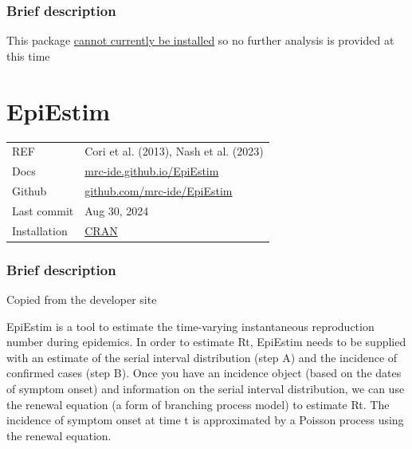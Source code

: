 \documentclass[
  letterpaper,
  DIV=11,
  numbers=noendperiod]{scrreprt}
\begin{document}
\subsection*{Brief description}\label{brief-description-2}

This package
\href{https://github.com/ImperialCollegeLondon/epidemia/issues/67}{cannot
currently be installed} so no further analysis is provided at this time

\chapter*{EpiEstim}\label{epiestim}


\begin{longtable}[]{@{}
  >{\raggedright\arraybackslash}p{}
  >{\raggedright\arraybackslash}p{}@{}}
\toprule\noalign{}
\endhead
\bottomrule\noalign{}
\endlastfoot
REF & Cori et al. (2013), Nash et al. (2023) \\
Docs &
\href{https://mrc-ide.github.io/EpiEstim/}{mrc-ide.github.io/EpiEstim} \\
Github &
\href{https://github.com/mrc-ide/EpiEstim}{github.com/mrc-ide/EpiEstim} \\
Last commit & Aug 30, 2024 \\
Installation &
\href{https://cran.r-project.org/web/packages/EpiEstim/index.html}{CRAN} \\
\end{longtable}

\subsection*{Brief description}\label{brief-description-3}

Copied from the developer site

EpiEstim is a tool to estimate the time-varying instantaneous
reproduction number during epidemics. In order to estimate Rt, EpiEstim
needs to be supplied with an estimate of the serial interval
distribution (step A) and the incidence of confirmed cases (step B).
Once you have an incidence object (based on the dates of symptom onset)
and information on the serial interval distribution, we can use the
renewal equation (a form of branching process model) to estimate Rt. The
incidence of symptom onset at time t is approximated by a Poisson
process using the renewal equation.
\end{document}
